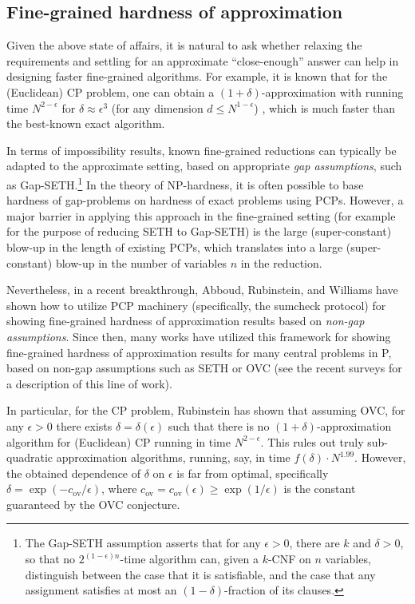 \documentclass[11pt]{article}
\theoremstyle{plain}
\theoremstyle{remark}
\newcommand{\ov}{\mathrm{ov}}
\begin{document}
\subsection{Fine-grained hardness of approximation}

Given the above state of affairs, it is natural to ask whether relaxing the requirements and settling  
for an approximate ``close-enough'' answer can help in designing faster fine-grained algorithms. For example, it is known that for the (Euclidean) CP problem, one can obtain a $(1+\delta)$-approximation with running time $N^{2-\epsilon}$ for $\delta \approx \epsilon^3$ (for any dimension $d \leq N^{1-\epsilon}$) \cite{ACW16}, which is much faster than the best-known exact algorithm.

In terms of impossibility results, known fine-grained reductions can typically be adapted to the approximate setting, based on appropriate 
\emph{gap assumptions},  such as Gap-SETH.\footnote{ The Gap-SETH assumption asserts that for any $\epsilon>0$, there are $k$ and $\delta >0$,  so that no $2^{(1-\epsilon)n}$-time algorithm can, given a $k$-CNF on $n$ variables, distinguish between the case that it is satisfiable, and the case that any assignment satisfies at most an $(1-\delta)$-fraction of its clauses.} 
 In the theory of NP-hardness, it is often possible to base hardness of gap-problems on hardness of exact  problems using PCPs. However, a major barrier  in applying this approach in the fine-grained setting (for example for the purpose of reducing  SETH to Gap-SETH) is the large (super-constant) blow-up in the length of existing PCPs, which translates into a large (super-constant) blow-up in the number of variables $n$ in the reduction. 

Nevertheless, in a recent breakthrough, Abboud, Rubinstein, and Williams \cite{ARW17}   have shown how to utilize PCP machinery (specifically, the sumcheck protocol) for showing fine-grained hardness of approximation results based on \emph{non-gap assumptions}. Since then,  
many works have utilized this framework for showing fine-grained hardness of approximation results for many central problems in P, based on non-gap assumptions such as SETH or OVC 
(see the recent surveys \cite{RW19, FSLM20} for a description of this line of work). 

In particular, for the CP problem, Rubinstein \cite{Rub18} has shown that assuming OVC, for any $\epsilon >0$ there exists $\delta = \delta(\epsilon)$ such that there is no 
$(1+\delta)$-approximation algorithm for (Euclidean)  CP running in time $N^{2-\epsilon}$. This rules out truly sub-quadratic approximation algorithms, running, say, in time $f(\delta) \cdot N^{1.99}$.  However, the obtained dependence of $\delta$ on $\epsilon$ is far from optimal, specifically
$\delta =\exp(- c_{\ov}/\epsilon)$, where $c_{\ov}=c_{\ov}(\epsilon) \geq \exp(1/\epsilon)$ is the constant guaranteed by the OVC conjecture.
\end{document}
